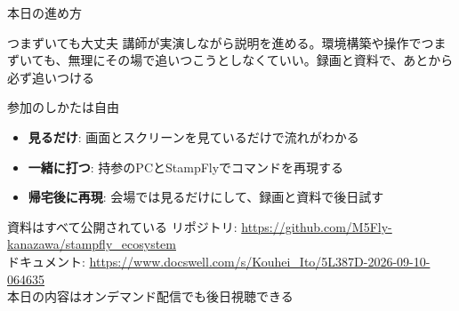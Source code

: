 \begin{frame}[fragile]{本日の進め方}
  \begin{block}{つまずいても大丈夫}
    \footnotesize 講師が実演しながら説明を進める。環境構築や操作でつまずいても、無理にその場で追いつこうとしなくていい。録画と資料で、あとから必ず追いつける
  \end{block}

  \vspace{0.15em}

  \begin{block}{参加のしかたは自由}
    \begin{itemize}\footnotesize
      \item \textbf{見るだけ}: 画面とスクリーンを見ているだけで流れがわかる
      \item \textbf{一緒に打つ}: 持参のPCとStampFlyでコマンドを再現する
      \item \textbf{帰宅後に再現}: 会場では見るだけにして、録画と資料で後日試す
    \end{itemize}
  \end{block}

  \vspace{0.15em}

  \begin{exampleblock}{資料はすべて公開されている}
    \footnotesize
    リポジトリ: \url{https://github.com/M5Fly-kanazawa/stampfly_ecosystem}\\
    ドキュメント: \url{https://www.docswell.com/s/Kouhei_Ito/5L387D-2026-09-10-064635}\\
    本日の内容はオンデマンド配信でも後日視聴できる
  \end{exampleblock}
\end{frame}

